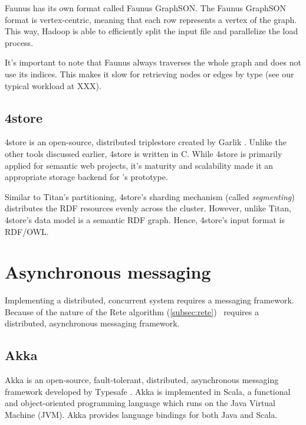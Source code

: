 Faunus has its own format called Faunus GraphSON. The Faunus GraphSON format is vertex-centric, meaning that each row represents a vertex of the graph. This way, Hadoop is able to efficiently split the input file and parallelize the load process.


It's important to note that Faunus always traverses the whole graph and does not use its indices. This makes it slow for retrieving nodes or edges by type (see our typical workload at XXX).

\subsection{4store}

4store is an open-source, distributed triplestore created by Garlik \cite{4store}. Unlike the other tools discussed earlier, 4store is written in C. While 4store is primarily applied for semantic web projects, it's maturity and scalability made it an appropriate storage backend for \iqd's prototype.

Similar to Titan's partitioning, 4store's sharding mechanism (called \emph{segmenting}) distributes the RDF resources evenly across the cluster. However, unlike Titan, 4store's data model is a semantic RDF graph. Hence, 4store's input format is RDF/OWL.


\section{Asynchronous messaging}

Implementing a distributed, concurrent system requires a messaging framework. Because of the nature of the Rete algorithm (\ref{subsec:rete}) \iqd\ requires a distributed, asynchronous messaging framework.

\subsection{Akka}


Akka is an open-source, fault-tolerant, distributed, asynchronous messaging framework developed by Typesafe . Akka is implemented in Scala, a functional and object-oriented programming language which runs on the Java Virtual Machine (JVM). Akka provides language bindings for both Java and Scala.

